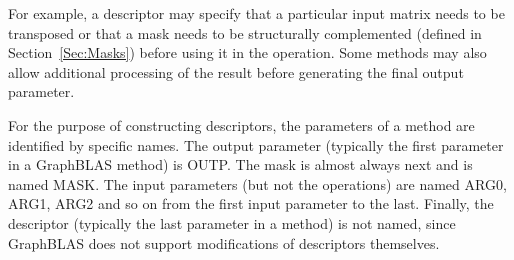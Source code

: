 For example, a descriptor may specify that a particular input matrix
needs to be transposed or that a mask needs to be structurally complemented 
(defined in Section~\ref{Sec:Masks})
before using it in the operation.  Some methods may also allow additional
processing of the result before generating the final output parameter.

For the purpose of constructing descriptors, the parameters of a method
are identified by specific names. The output parameter (typically
the first parameter in a GraphBLAS method) is {\sf OUTP}.  The mask is 
almost always next and is named {\sf MASK}. The input parameters (but
not the operations) are named {\sf ARG0}, {\sf ARG1}, {\sf ARG2} and so 
on from the first input parameter to the last. Finally, the descriptor
(typically the last parameter in a method) is not named, since GraphBLAS
does not support modifications of descriptors themselves.
